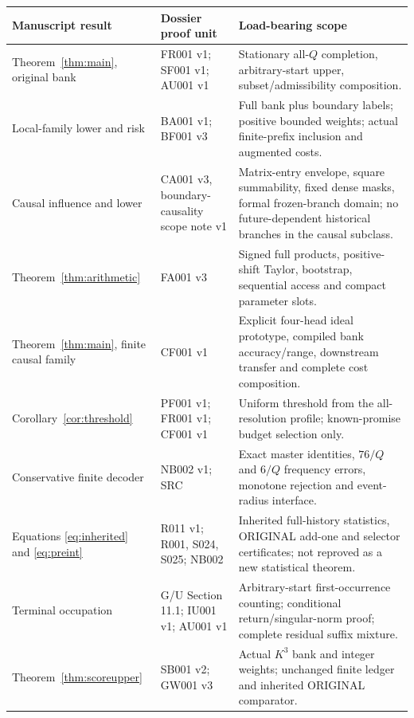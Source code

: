 \documentclass[11pt,letterpaper]{article}
\theoremstyle{definition}\newtheorem{definition}[theorem]{Definition}
\theoremstyle{remark}\newtheorem{remark}[theorem]{Remark}
\newcommand{\unit}[1]{\textsf{#1}}
\begin{document}
\begin{center}\small
\begin{longtable}{@{}>{\raggedright\arraybackslash}p{}>{\raggedright\arraybackslash}p{}>{\raggedright\arraybackslash}p{}@{}}
\toprule
Manuscript result & Dossier proof unit & Load-bearing scope\\\midrule\endhead
Theorem~\ref{thm:main}, original bank & \unit{FR001 v1}; \unit{SF001 v1}; \unit{AU001 v1} & Stationary all-$Q$ completion, arbitrary-start upper, subset/admissibility composition.\\[4pt]
Local-family lower and risk & \unit{BA001 v1}; \unit{BF001 v3} & Full bank plus boundary labels; positive bounded weights; actual finite-prefix inclusion and augmented costs.\\[4pt]
Causal influence and lower & \unit{CA001 v3}, boundary-causality scope note v1 & Matrix-entry envelope, square summability, fixed dense masks, formal frozen-branch domain; no future-dependent historical branches in the causal subclass.\\[4pt]
Theorem~\ref{thm:arithmetic} & \unit{FA001 v3} & Signed full products, positive-shift Taylor, bootstrap, sequential access and compact parameter slots.\\[4pt]
Theorem~\ref{thm:main}, finite causal family & \unit{CF001 v1} & Explicit four-head ideal prototype, compiled bank accuracy/range, downstream transfer and complete cost composition.\\[4pt]
Corollary~\ref{cor:threshold} & \unit{PF001 v1}; \unit{FR001 v1}; \unit{CF001 v1} & Uniform threshold from the all-resolution profile; known-promise budget selection only.\\[4pt]
Conservative finite decoder & \unit{NB002 v1}; \unit{SRC} & Exact master identities, $76/Q$ and $6/Q$ frequency errors, monotone rejection and event-radius interface.\\[4pt]
Equations \eqref{eq:inherited} and \eqref{eq:preint} & \unit{R011 v1}; \unit{R001}, \unit{S024}, \unit{S025}; \unit{NB002} & Inherited full-history statistics, ORIGINAL add-one and selector certificates; not reproved as a new statistical theorem.\\[4pt]
Terminal occupation & \unit{G/U} Section 11.1; \unit{IU001 v1}; \unit{AU001 v1} & Arbitrary-start first-occurrence counting; conditional return/singular-norm proof; complete residual suffix mixture.\\[4pt]
Theorem~\ref{thm:scoreupper} & \unit{SB001 v2}; \unit{GW001 v3} & Actual $K^3$ bank and integer weights; unchanged finite ledger and inherited ORIGINAL comparator.\\[4pt]

\end{longtable}
\end{center}
\end{document}
